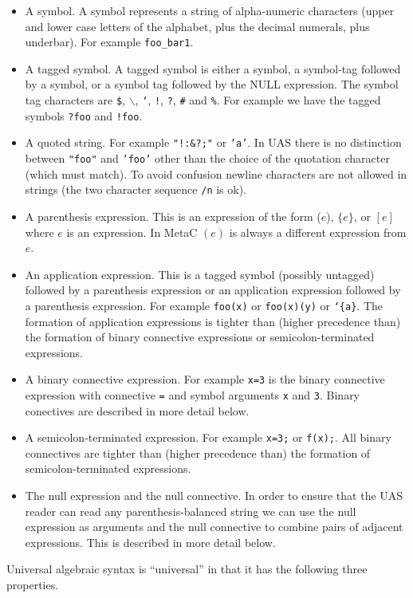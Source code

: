 \documentclass{article}
\begin{document}
\begin{itemize}
\item A symbol.  A symbol represents a string of alpha-numeric characters (upper and lower case letters of the alphabet, plus the decimal numerals, plus underbar).
  For example {\tt  foo\_bar1}.
\item A tagged symbol.  A tagged symbol is either a symbol, a symbol-tag followed by a symbol, or a symbol tag followed by the NULL expression.
The symbol tag characters are {\tt \$}, {\tt $\backslash$}, {\tt `}, {\tt !}, {\tt ?}, {\tt \#} and {\tt \%}.
  For example we have the tagged symbols {\tt ?foo} and {\tt !foo}.
\item A quoted string.  For example {\tt \tt "!:\&?;"} or {\tt 'a'}.  In UAS there is no distinction between {\tt "foo"} and {\tt 'foo'} other than the choice of the quotation character (which must match).
  To avoid confusion newline characters are not allowed in strings (the two character sequence {\tt /n} is ok).
\item A parenthesis expression.  This is an expression of the form ($e$), $\{e\}$, or $[e]$ where $e$ is an expression.  In MetaC $(e)$ is always a different expression from $e$.
\item An application expression.  This is a tagged symbol (possibly untagged) followed by a parenthesis expression or an application expression followed by a parenthesis expression.  For example {\tt foo(x)} or {\tt foo(x)(y)} or {\tt `\{a\}}.
The formation of application expressions is tighter than (higher precedence than) the formation of binary connective expressions or semicolon-terminated expressions.
\item A binary connective expression.  For example {\tt x=3} is the binary connective expression with connective {\tt =} and symbol arguments {\tt x} and {\tt 3}.  Binary conectives are described in more detail below.
\item A semicolon-terminated expression. For example {\tt x=3;} or {\tt f(x);}. All binary connectives are tighter than (higher precedence than)
the formation of semicolon-terminated expressions.
\item The null expression and the null connective. In order to ensure that the UAS reader can read any parenthesis-balanced string we can use the null
  expression as arguments and the null connective to combine pairs of adjacent expressions.  This is described in more detail below.
\end{itemize}

\noindent Universal algebraic syntax is ``universal'' in that it has the following three properties.
\end{document}
